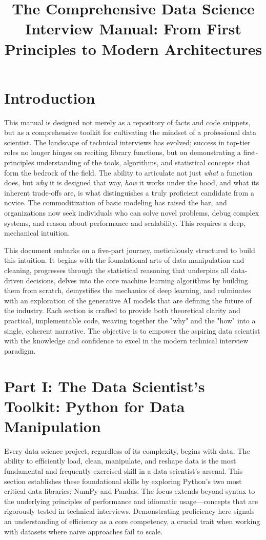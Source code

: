 \documentclass[11pt,a4paper]{article}
\title{The Comprehensive Data Science Interview Manual: From First Principles to Modern Architectures}
\author{}
\date{}
\begin{document}
\maketitle
\tableofcontents
\newpage

\section*{Introduction}

This manual is designed not merely as a repository of facts and code snippets, but as a comprehensive toolkit for cultivating the mindset of a professional data scientist. The landscape of technical interviews has evolved; success in top-tier roles no longer hinges on reciting library functions, but on demonstrating a first-principles understanding of the tools, algorithms, and statistical concepts that form the bedrock of the field. The ability to articulate not just \textit{what} a function does, but \textit{why} it is designed that way, \textit{how} it works under the hood, and what its inherent trade-offs are, is what distinguishes a truly proficient candidate from a novice. The commoditization of basic modeling has raised the bar, and organizations now seek individuals who can solve novel problems, debug complex systems, and reason about performance and scalability. This requires a deep, mechanical intuition.

This document embarks on a five-part journey, meticulously structured to build this intuition. It begins with the foundational arts of data manipulation and cleaning, progresses through the statistical reasoning that underpins all data-driven decisions, delves into the core machine learning algorithms by building them from scratch, demystifies the mechanics of deep learning, and culminates with an exploration of the generative AI models that are defining the future of the industry. Each section is crafted to provide both theoretical clarity and practical, implementable code, weaving together the "why" and the "how" into a single, coherent narrative. The objective is to empower the aspiring data scientist with the knowledge and confidence to excel in the modern technical interview paradigm.

\section{Part I: The Data Scientist's Toolkit: Python for Data Manipulation}

Every data science project, regardless of its complexity, begins with data. The ability to efficiently load, clean, manipulate, and reshape data is the most fundamental and frequently exercised skill in a data scientist's arsenal. This section establishes these foundational skills by exploring Python's two most critical data libraries: NumPy and Pandas. The focus extends beyond syntax to the underlying principles of performance and idiomatic usage—concepts that are rigorously tested in technical interviews. Demonstrating proficiency here signals an understanding of efficiency as a core competency, a crucial trait when working with datasets where naive approaches fail to scale.
\end{document}
